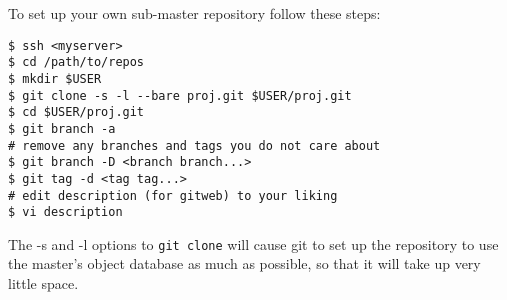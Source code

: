 \documentclass[a4paper,10pt]{article}
\begin{document}
To set up your own sub-master repository follow these steps:
\begin{verbatim}
$ ssh <myserver>
$ cd /path/to/repos
$ mkdir $USER
$ git clone -s -l --bare proj.git $USER/proj.git
$ cd $USER/proj.git 
$ git branch -a 
# remove any branches and tags you do not care about
$ git branch -D <branch branch...>
$ git tag -d <tag tag...>
# edit description (for gitweb) to your liking 
$ vi description
\end{verbatim}
The -s and -l options to {\tt git clone} will cause git to set up the
repository to use the master's object database as much as possible, so that it
will take up very little space. 





\end{document}
